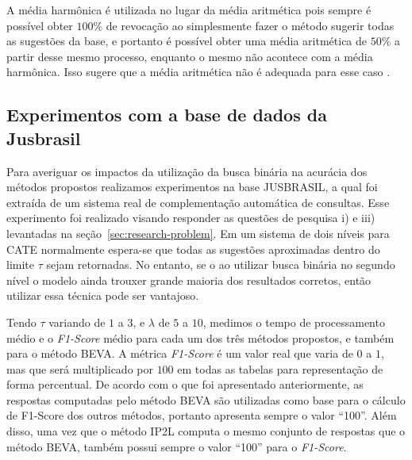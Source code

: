 A média harmônica é utilizada no lugar da média aritmética pois sempre é possível obter $100\%$ de revocação ao simplesmente fazer o método sugerir todas as sugestões da base, e portanto é possível obter uma média aritmética de $50\%$ a partir desse mesmo processo, enquanto o mesmo não acontece com a média harmônica. Isso sugere que a média aritmética não é adequada para esse caso \citep{irbookchristopher}.

\subsection{Experimentos com a base de dados da Jusbrasil}

Para averiguar os impactos da utilização da busca binária na acurácia dos métodos propostos realizamos experimentos na base JUSBRASIL, a qual foi extraída de um sistema real de complementação automática de consultas. Esse experimento foi realizado visando responder as questões de pesquisa i) e iii) levantadas na seção~\ref{sec:research-problem}. Em um sistema de dois níveis para CATE normalmente espera-se que todas as sugestões aproximadas dentro do limite $\tau$ sejam retornadas. No entanto, se o ao utilizar busca binária no segundo nível o modelo ainda trouxer grande maioria dos resultados corretos, então utilizar essa técnica pode ser vantajoso.

Tendo $\tau$ variando de $1$ a $3$, e $\lambda$ de $5$ a $10$, medimos o tempo de processamento médio e o \textit{F1-Score} médio para cada um dos três métodos propostos, e também para o método BEVA. A métrica \textit{F1-Score} é um valor real que varia de $0$ a $1$, mas que será multiplicado por $100$ em todas as tabelas para representação de forma percentual. De acordo com o que foi apresentado anteriormente, as respostas computadas pelo método BEVA são utilizadas como base para o cálculo de F1-Score dos outros métodos, portanto apresenta sempre o valor ``100''. Além disso, uma vez que o método IP2L computa o mesmo conjunto de respostas que o método BEVA, também possui sempre o valor ``100'' para o \textit{F1-Score}.


